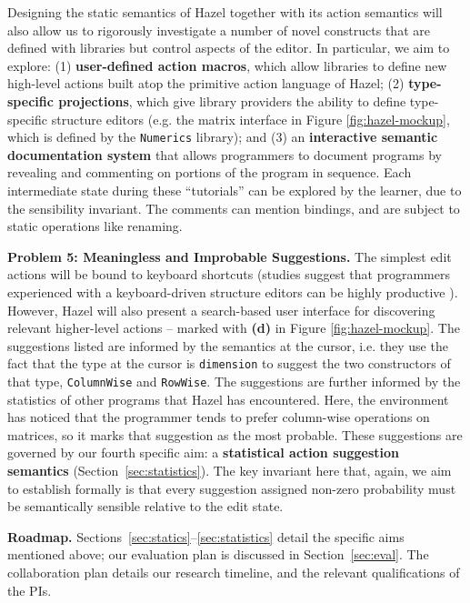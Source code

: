 \documentclass{purple}
\let\li\lstinline
\newcommand{\Hazel}[0]{\textsf{Hazel}\xspace}
\newcommand{\HazelEnv}[0]{\Hazel\xspace}
\begin{document}
Designing the static semantics of \HazelEnv together with its action semantics 
will also allow us to rigorously investigate a number of novel constructs that 
are defined with libraries but control aspects of the editor. In particular, we aim to explore:
(1) \textbf{user-defined action macros}, which allow libraries to define new high-level
actions built atop the primitive action language of \HazelEnv; (2) \textbf{type-specific
projections}, which give library providers the ability to define type-specific structure editors (e.g. the matrix interface in Figure \ref{fig:hazel-mockup}, which is defined  
by the \li{Numerics} library); and (3) an \textbf{interactive semantic documentation system} that
allows programmers to document programs by revealing and commenting on portions of the 
program in sequence. Each intermediate state during these ``tutorials'' can be explored 
by the learner, due to the sensibility invariant. The comments can mention bindings, and are 
subject to static operations like renaming.

\vspace{0.25ex}
\noindent\textbf{Problem 5: Meaningless and Improbable Suggestions.} The simplest 
edit actions will be bound to keyboard shortcuts (studies suggest that programmers experienced with a keyboard-driven structure editors can be highly productive \cite{DBLP:conf/vl/Asenov014}). However, \HazelEnv will 
also present a search-based user
interface for discovering relevant higher-level actions -- marked with \textbf{(d)} in Figure \ref{fig:hazel-mockup}. 
The suggestions 
listed are informed by the semantics at the cursor, i.e. they use the fact that
the type at the cursor is \li{dimension} to suggest the two constructors of that
type, \li{ColumnWise} and \li{RowWise}. The suggestions are further informed by
the statistics of other programs that \HazelEnv has encountered.  Here, the
environment has noticed that the programmer tends to prefer column-wise operations on 
matrices, so it marks that suggestion as the most probable. These suggestions are governed by
our fourth specific aim: a \textbf{statistical action suggestion semantics} (Section~\ref{sec:statistics}). The key invariant here that, again, we aim to establish 
formally is that every suggestion assigned non-zero probability must be semantically sensible 
relative to the edit state.%

\vspace{0.25ex}
\noindent\textbf{Roadmap.} Sections~\ref{sec:statics}--\ref{sec:statistics} detail the
specific aims mentioned above; our evaluation plan is discussed in Section~\ref{sec:eval}.
The collaboration plan details our 
research timeline, and the relevant qualifications of the PIs.
\end{document}
